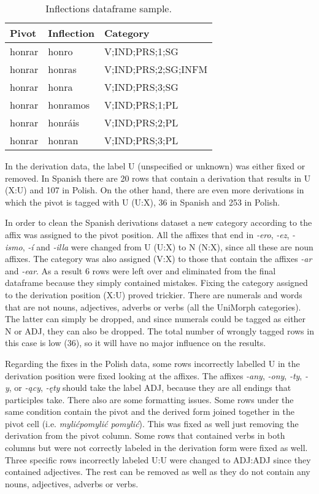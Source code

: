 \documentclass[12pt]{article}
\begin{document}
\begin{table}[h!]
    \centering
    \small
    \begin{tabular}{lll}
        \toprule
        \textbf{Pivot} & \textbf{Inflection} & \textbf{Category} \\ 
        \midrule
        honrar	& honro &	V;IND;PRS;1;SG \\
        honrar	& honras &	V;IND;PRS;2;SG;INFM \\
        honrar	& honra &	V;IND;PRS;3;SG \\
        honrar	& honramos &	V;IND;PRS;1;PL \\
        honrar	& honráis &	V;IND;PRS;2;PL \\
        honrar	& honran &	V;IND;PRS;3;PL \\
        \bottomrule
    \end{tabular}
    \caption{Inflections dataframe sample.}
    \label{tab:infl-sample}
\end{table}

In the derivation data, the label U (unspecified or unknown) was either fixed or removed. In Spanish there are 20 rows that contain a derivation that results in U (X:U) and 107 in Polish. On the other hand, there are even more derivations in which the pivot is tagged with U (U:X), 36 in Spanish and 253 in Polish.

In order to clean the Spanish derivations dataset a new category according to the affix was assigned to the pivot position. All the affixes that end in \textit{-ero}, \textit{-ez}, \textit{-ismo}, \textit{-í} and \textit{-illa} were changed from U (U:X) to N (N:X), since all these are noun affixes. The category was also assigned (V:X) to those that contain the affixes \textit{-ar} and \textit{-ear}. As a result 6 rows were left over and eliminated from the final dataframe because they simply contained mistakes. Fixing the category assigned to the derivation position (X:U) proved trickier. There are numerals and words that are not nouns, adjectives, adverbs or verbs (all the UniMorph categories). The latter can simply be dropped, and since numerals could be tagged as either N or ADJ, they can also be dropped. The total number of wrongly tagged rows in this case is low (36), so it will have no major influence on the results.

Regarding the fixes in the Polish data, some rows incorrectly labelled U in the derivation position were fixed looking at the affixes. The affixes \textit{-any}, \textit{-ony}, \textit{-ty}, \textit{-y}, or \textit{-ący}, \textit{-ęty} should take the label ADJ, because they are all endings that participles take. There also are some formatting issues. Some rows under the same condition contain the pivot and the derived form joined together in the pivot cell (i.e. \textit{mylićpomylić pomylić}). This was fixed as well just removing the derivation from the pivot column. Some rows that contained verbs in both columns but were not correctly labeled in the derivation form were fixed as well. Three specific rows incorrectly labeled U:U were changed to ADJ:ADJ since they contained adjectives. The rest can be removed as well as they do not contain any nouns, adjectives, adverbs or verbs.
\end{document}
